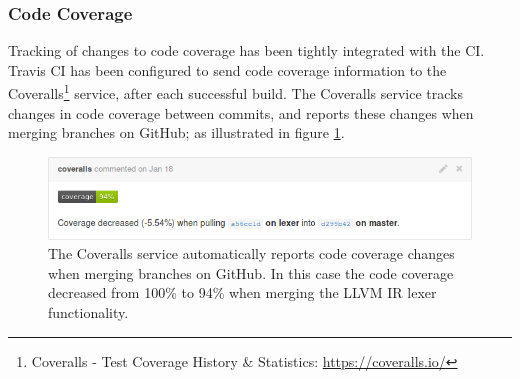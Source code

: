 
\subsubsection{Code Coverage}

Tracking of changes to code coverage has been tightly integrated with the CI. Travis CI has been configured to send code coverage information to the Coveralls\footnote{Coveralls - Test Coverage History \& Statistics: \url{https://coveralls.io/}} service, after each successful build. The Coveralls service tracks changes in code coverage between commits, and reports these changes when merging branches on GitHub; as illustrated in figure \ref{fig:coveralls}.

\begin{figure}[htbp]
	\begin{center}
		\includegraphics[width=\textwidth]{inc/8_ver/coveralls.png}
		\caption{The Coveralls service automatically reports code coverage changes when merging branches on GitHub. In this case the code coverage decreased from 100\% to 94\% when merging the LLVM IR lexer functionality.}
		\label{fig:coveralls}
	\end{center}
\end{figure}
